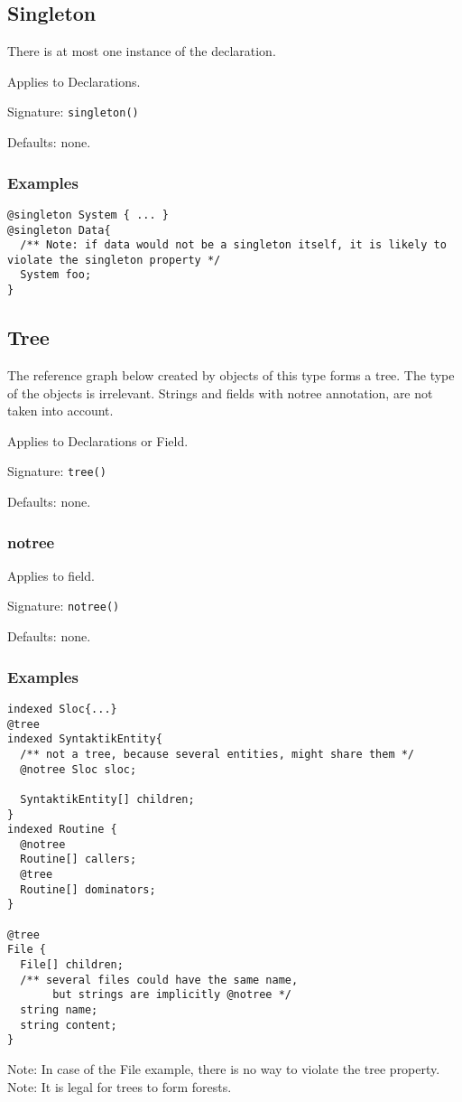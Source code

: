\documentclass[a4paper,10pt]{article}
\begin{document}
\subsection*{Singleton}
There is at most one instance of the declaration.

Applies to Declarations.

Signature: \verb/singleton()/

Defaults: none.

\subsubsection*{Examples}

\begin{verbatim}
@singleton System { ... }
@singleton Data{
  /** Note: if data would not be a singleton itself, it is likely to violate the singleton property */
  System foo;
}
\end{verbatim}


\subsection*{Tree}
The reference graph below created by objects of this type forms a tree. The type of the objects is irrelevant. Strings and fields with notree annotation, are not taken into account.

Applies to Declarations or Field.

Signature: \verb/tree()/

Defaults: none.


\subsubsection*{notree}
Applies to field.

Signature: \verb/notree()/

Defaults: none.

\subsubsection*{Examples}
\begin{verbatim}
indexed Sloc{...}
@tree
indexed SyntaktikEntity{
  /** not a tree, because several entities, might share them */
  @notree Sloc sloc;
  
  SyntaktikEntity[] children;
}
indexed Routine {
  @notree
  Routine[] callers;
  @tree
  Routine[] dominators;
}

@tree
File {
  File[] children;
  /** several files could have the same name,
       but strings are implicitly @notree */
  string name;
  string content;
} 
\end{verbatim}
Note: In case of the File example, there is no way to violate the tree property.
Note: It is legal for trees to form forests.
\end{document}
